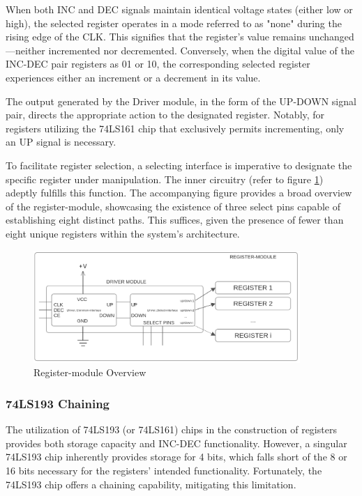When both INC and DEC signals maintain identical voltage states (either low or high), the selected register operates in a mode referred to as "none" during the rising edge of the CLK. This signifies that the register's value remains unchanged—neither incremented nor decremented. Conversely, when the digital value of the INC-DEC pair registers as 01 or 10, the corresponding selected register experiences either an increment or a decrement in its value.

The output generated by the Driver module, in the form of the UP-DOWN signal pair, directs the appropriate action to the designated register. Notably, for registers utilizing the 74LS161 chip that exclusively permits incrementing, only an UP signal is necessary.

To facilitate register selection, a selecting interface is imperative to designate the specific register under manipulation. The inner circuitry (refer to figure \ref{fig:registerModuleOverview}) adeptly fulfills this function. The accompanying figure provides a broad overview of the register-module, showcasing the existence of three select pins capable of establishing eight distinct paths. This suffices, given the presence of fewer than eight unique registers within the system's architecture.

\begin{figure}[H]
	\centering
	\includegraphics[width=0.9\textwidth]{img/register_module_overview}
	\caption{Register-module Overview}
	\label{fig:registerModuleOverview}
\end{figure}

\subsubsection{74LS193 Chaining}
The utilization of 74LS193 (or 74LS161) chips in the construction of registers provides both storage capacity and INC-DEC functionality. However, a singular 74LS193 chip inherently provides storage for 4 bits, which falls short of the 8 or 16 bits necessary for the registers' intended functionality. Fortunately, the 74LS193 chip offers a chaining capability, mitigating this limitation.

